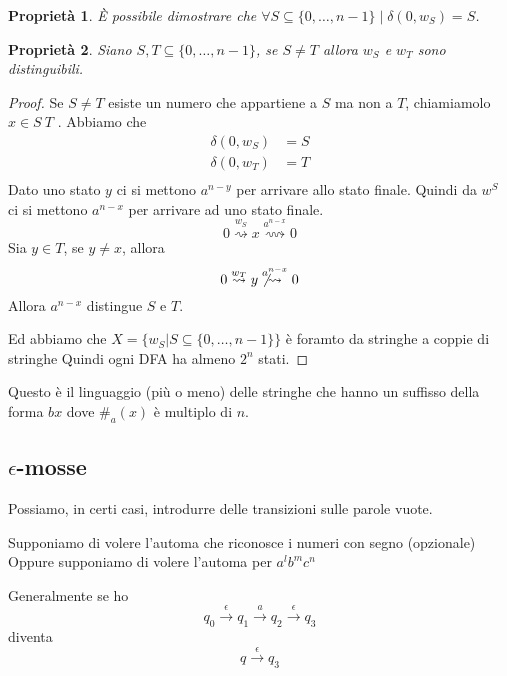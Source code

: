 \documentclass[12pt]{article}
\newtheorem{proprietà}{Proprietà}
\begin{document}
	\begin{proprietà}
	\`E possibile dimostrare che $\forall S \subseteq \{0, \dots, n - 1\} \mid \delta(0, w_S) = S$. 
	\end{proprietà}
	\begin{proprietà}
	Siano $S, T \subseteq \{0, \dots, n - 1\}$, se $S \neq T$ allora $w_S$ e $w_T$ sono distinguibili. 
	\end{proprietà}
	\begin{proof}	%
		Se $S \neq T$ esiste un numero che appartiene a $S$ ma non a $T$, chiamiamolo $x \in S \ T$ .
		Abbiamo che
		\begin{align*}
			\delta(0, w_S) &= S \\
			\delta(0, w_T) &= T \\
		\end{align*}
		Dato uno stato $y$ ci si mettono $a^{n - y}$ per arrivare allo stato finale.
		Quindi da $w^S$ ci si mettono $a^{n - x}$ per arrivare ad uno stato finale.
		$$ 0 \overset{w_S}{\rightsquigarrow} x \overset{a^{n - x}}{\rightsquigarrow} 0 $$
		Sia $y \in T$, se $y \neq x$, allora
		$$ 0 \overset{w_T}{\rightsquigarrow} y \not \overset{a^{n - x}}{\rightsquigarrow} 0 $$
		Allora $a^{n - x}$ distingue $S$ e $T$.

		Ed abbiamo che $X = \{ w_S | S \subseteq \{0, \dots, n - 1 \} \}$ è foramto da stringhe a coppie di stringhe %
		Quindi ogni DFA ha almeno $2^n$ stati.
	\end{proof}
	Questo è il linguaggio (più o meno) delle stringhe che hanno un suffisso della forma $bx$ dove $\#_a(x)$ è multiplo di $n$.

\subsection{$\epsilon$-mosse}
Possiamo, in certi casi, introdurre delle transizioni sulle parole vuote.
\begin{tcolorbox}
	Supponiamo di volere l'automa che riconosce i numeri con segno (opzionale)
	Oppure supponiamo di volere l'automa per $a^lb^mc^n$
\end{tcolorbox}
Generalmente se ho
$$ q_0 \overset{\epsilon}{\rightarrow} q_1 \overset{a}{\rightarrow} q_2 \overset{\epsilon}{\rightarrow} q_3 $$
diventa
$$ q \overset{\epsilon}{\rightarrow} q_3 $$
\end{document}
